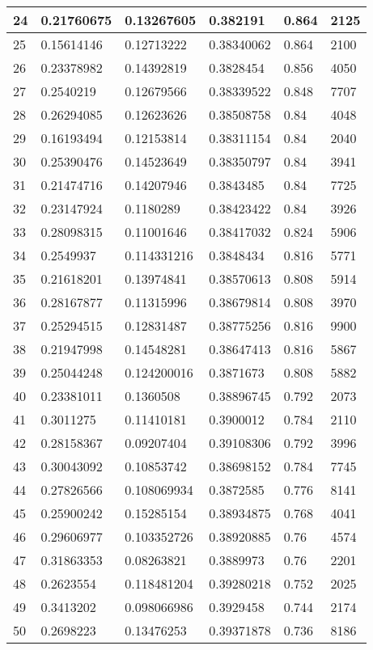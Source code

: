 \begin{longtable}{|l|l|l|l|l|l|}
24 & 0.21760675 & 0.13267605 & 0.382191 & 0.864 & 2125 \\ \hline 
25 & 0.15614146 & 0.12713222 & 0.38340062 & 0.864 & 2100 \\ \hline 
26 & 0.23378982 & 0.14392819 & 0.3828454 & 0.856 & 4050 \\ \hline 
27 & 0.2540219 & 0.12679566 & 0.38339522 & 0.848 & 7707 \\ \hline 
28 & 0.26294085 & 0.12623626 & 0.38508758 & 0.84 & 4048 \\ \hline 
29 & 0.16193494 & 0.12153814 & 0.38311154 & 0.84 & 2040 \\ \hline 
30 & 0.25390476 & 0.14523649 & 0.38350797 & 0.84 & 3941 \\ \hline 
31 & 0.21474716 & 0.14207946 & 0.3843485 & 0.84 & 7725 \\ \hline 
32 & 0.23147924 & 0.1180289 & 0.38423422 & 0.84 & 3926 \\ \hline 
33 & 0.28098315 & 0.11001646 & 0.38417032 & 0.824 & 5906 \\ \hline 
34 & 0.2549937 & 0.114331216 & 0.3848434 & 0.816 & 5771 \\ \hline 
35 & 0.21618201 & 0.13974841 & 0.38570613 & 0.808 & 5914 \\ \hline 
36 & 0.28167877 & 0.11315996 & 0.38679814 & 0.808 & 3970 \\ \hline 
37 & 0.25294515 & 0.12831487 & 0.38775256 & 0.816 & 9900 \\ \hline 
38 & 0.21947998 & 0.14548281 & 0.38647413 & 0.816 & 5867 \\ \hline 
39 & 0.25044248 & 0.124200016 & 0.3871673 & 0.808 & 5882 \\ \hline 
40 & 0.23381011 & 0.1360508 & 0.38896745 & 0.792 & 2073 \\ \hline 
41 & 0.3011275 & 0.11410181 & 0.3900012 & 0.784 & 2110 \\ \hline 
42 & 0.28158367 & 0.09207404 & 0.39108306 & 0.792 & 3996 \\ \hline 
43 & 0.30043092 & 0.10853742 & 0.38698152 & 0.784 & 7745 \\ \hline 
44 & 0.27826566 & 0.108069934 & 0.3872585 & 0.776 & 8141 \\ \hline 
45 & 0.25900242 & 0.15285154 & 0.38934875 & 0.768 & 4041 \\ \hline 
46 & 0.29606977 & 0.103352726 & 0.38920885 & 0.76 & 4574 \\ \hline 
47 & 0.31863353 & 0.08263821 & 0.3889973 & 0.76 & 2201 \\ \hline 
48 & 0.2623554 & 0.118481204 & 0.39280218 & 0.752 & 2025 \\ \hline 
49 & 0.3413202 & 0.098066986 & 0.3929458 & 0.744 & 2174 \\ \hline 
50 & 0.2698223 & 0.13476253 & 0.39371878 & 0.736 & 8186 \\ \hline 
\end{longtable}
